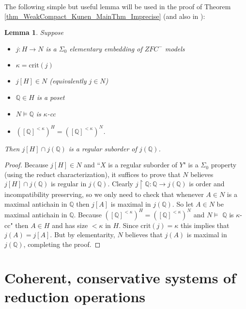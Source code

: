 \documentclass{amsart}
\newtheorem{lemma}[theorem]{Lemma}
\begin{document}
The following simple but useful lemma will be used in the proof of Theorem \ref{thm_WeakCompact_Kunen_MainThm_Imprecise} (and also in \cite{Cox_Luecke}):
\begin{lemma}\label{lem_EmbeddingsAndKappaCC}
Suppose 
\begin{itemize}
 \item $j: H \to N$ is a $\Sigma_0$ elementary embedding of $ZFC^-$ models
 \item $\kappa= \text{crit}(j)$
 \item $j[H] \in N$ (equivalently $j \in N$)
 \item $\mathbb{Q} \in H$ is a poset
 \item $N \models \mathbb{Q}$ is $\kappa$-cc
 \item $([\mathbb{Q}]^{<\kappa})^H = ([\mathbb{Q}]^{<\kappa})^N$.
\end{itemize}
Then $j[H] \cap j(\mathbb{Q})$ is a regular suborder of $j(\mathbb{Q})$. 
\end{lemma}
\begin{proof}
Because $j[H] \in N$ and ``$X$ is a regular suborder of $Y$" is a $\Sigma_0$ property (using the reduct characterization), it suffices to prove that $N$ believes $j[H] \cap j(\mathbb{Q})$ is regular in $j(\mathbb{Q})$.  Clearly $j \restriction \mathbb{Q}: \mathbb{Q} \to j(\mathbb{Q})$ is order and incompatibility preserving, so we only need to check that whenever $A \in N$ is a maximal antichain in $\mathbb{Q}$ then $j[A]$ is maximal in $j(\mathbb{Q})$.  So let $A \in N$ be maximal antichain in $\mathbb{Q}$.  Because $([\mathbb{Q}]^{<\kappa})^H = ([\mathbb{Q}]^{<\kappa})^N$ and $N \models$ $\mathbb{Q}$ is $\kappa$-cc" then $A \in H$ and has size $<\kappa$ in $H$.  Since $\text{crit}(j) = \kappa$ this implies that $j(A) = j[A]$.  But by elementarity, $N$ believes that $j(A)$ is maximal in $j(\mathbb{Q})$, completing the proof. 
\end{proof}






\section{Coherent, conservative systems of reduction operations}\label{sec_InductReductions}
\end{document}
